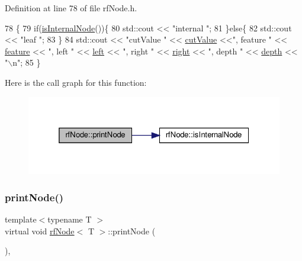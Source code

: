 Definition at line 78 of file rf\+Node.\+h.


\begin{DoxyCode}
78                                 \{
79             \textcolor{keywordflow}{if}(\hyperlink{classrfNode_a1df9f7bc841c6df1ef5aa67a72c6d09c}{isInternalNode}())\{
80                 std::cout << \textcolor{stringliteral}{"internal "};
81             \}\textcolor{keywordflow}{else}\{
82                 std::cout << \textcolor{stringliteral}{"leaf "};
83             \}
84             std::cout << \textcolor{stringliteral}{"cutValue "} << \hyperlink{classrfNode_a49b9c55f11f1f3898eb7811f78f68796}{cutValue} <<\textcolor{stringliteral}{", feature "} << 
      \hyperlink{classrfNode_ac8c0dd14a4e53f9b831f326f5d197e0e}{feature} << \textcolor{stringliteral}{", left "} << \hyperlink{classrfNode_ac8e195fc3d8a9647f10a42153d76119f}{left} << \textcolor{stringliteral}{", right "} << \hyperlink{classrfNode_a01e57d43ac8af60d16880544e99ed965}{right} << \textcolor{stringliteral}{", depth "} << 
      \hyperlink{classrfNode_a7cb8fb854d8ec90635bd7207d8b8c31e}{depth} << \textcolor{stringliteral}{"\(\backslash\)n"};
85         \}
\end{DoxyCode}
Here is the call graph for this function\+:
\nopagebreak
\begin{figure}[H]
\begin{center}
\leavevmode
\includegraphics[width=325pt]{classrfNode_afaa1b6e358070f895504f4faaefe5f37_cgraph}
\end{center}
\end{figure}
\mbox{\label{classrfNode_afaa1b6e358070f895504f4faaefe5f37}} 
\subsubsection{\texorpdfstring{print\+Node()}{printNode()}\hspace{0.1cm}{\footnotesize\ttfamily [2/2]}}
{\footnotesize\ttfamily template$<$typename T $>$ \\
virtual void \hyperlink{classrfNode}{rf\+Node}$<$ T $>$\+::print\+Node (\begin{DoxyParamCaption}{ }\end{DoxyParamCaption})\hspace{0.3cm}{\ttfamily [inline]}, {\ttfamily [virtual]}}



